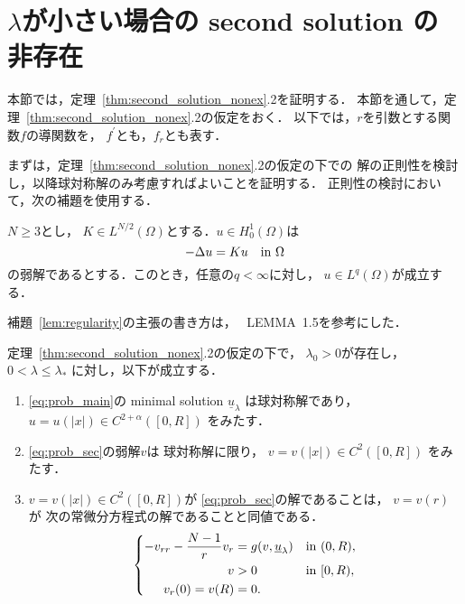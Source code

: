 \section{$\lambda$が小さい場合の second solution の非存在}
\label{sec:sym}

本節では，定理~\ref{thm:second_solution_nonex}.2を証明する．
本節を通して，定理~\ref{thm:second_solution_nonex}.2の仮定をおく．
以下では，$r$を引数とする関数$f$の導関数を，
$f^\prime$とも，$f_r$とも表す．

まずは，定理~\ref{thm:second_solution_nonex}.2の仮定の下での
解の正則性を検討し，以降球対称解のみ考慮すればよいことを証明する．
正則性の検討において，次の補題を使用する．

\begin{lem}[\cite{MR539217}] 
 \label{lem:regularity}
 $N \geq 3$とし，
 $K \in L^{N/2}(\Omega)$とする．$u \in H_0^1(\Omega)$は
 \[
  - \Delta u = K u \ \ ~\text{in}~ \Omega
 \]
 の弱解であるとする．このとき，任意の$q < \infty$に対し，
 $u \in L^q(\Omega)$が成立する．
\end{lem}

補題~\ref{lem:regularity}の主張の書き方は，
\cite{MR709644}~LEMMA~1.5を参考にした．

\begin{lem} \label{lem:reg_rad}
 定理~\ref{thm:second_solution_nonex}.2の仮定の下で，
 $\lambda_0 > 0$が存在し，$0 < \lambda \leq \lambda_*$
 に対し，以下が成立する．
 \begin{enumerate}[1.] \sage
  \item \ref{eq:prob_main}の minimal solution $\underline{u}_\lambda$
        は球対称解であり，
        $u = u(\lvert x \rvert)
        \in C^{2+\alpha}([0, R])$
        をみたす．
  \item \ref{eq:prob_sec}の弱解$v$は
        球対称解に限り，
        $v = v(\lvert x \rvert)
        \in C^2([0, R])$
        をみたす．
  \item $v = v(\lvert x \rvert) \in C^2([0, R])$が
        \ref{eq:prob_sec}の解であることは，
        $v = v(r)$が
        次の常微分方程式の解であることと同値である．
        \begin{align}
         \left\{
          \begin{aligned}
           -v_{rr} - \frac{N-1}{r}v_r  &= g(v, \underline{u}_\lambda)
           & &\text{in}~ (0, R),  \\
           v &> 0 & &\text{in}~ [0, R), \\
           v_r(0) = v(R) &= 0.  & &
          \end{aligned}
         \right. \label{eq:prob_rad}
        \end{align}
 \end{enumerate}
\end{lem}

